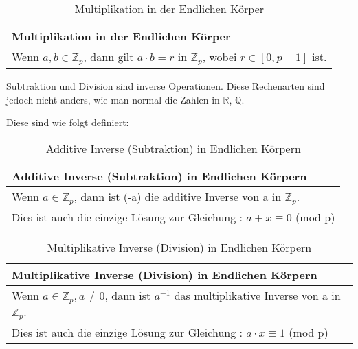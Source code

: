     \begin{table}[!ht]
        \centering
            \begin{tabular}{l}
                \toprule
                \textbf{Multiplikation in der Endlichen Körper}\\
                \midrule
                Wenn $ a, b \in \mathbb{Z}_p $, dann gilt $ a \cdot b =r$ in $ \mathbb{Z}_p $, wobei $r \in [0, p-1]$ ist.\\
               \bottomrule
            \end{tabular}
            \caption{Multiplikation in der Endlichen Körper\cite{sec1}}
            \label{tab3}
        \end{table}

Subtraktion und Division sind inverse Operationen. Diese Rechenarten sind jedoch nicht anders, wie man normal die Zahlen in $\mathbb{R}$, $\mathbb{Q}$.

Diese sind wie folgt definiert:
\begin{table}[!ht]
    \centering
        \begin{tabular}{l}
            \toprule
            \textbf{Additive Inverse (Subtraktion) in Endlichen Körpern}\\
            \midrule
            Wenn $a \in \mathbb{Z}_p$, dann ist (-a) die additive Inverse von a in $\mathbb{Z}_p$.\\
             Dies ist auch die einzige Lösung zur Gleichung : $a + x \equiv 0$ (mod p)\\
                        \bottomrule
        \end{tabular}
        \caption{Additive Inverse (Subtraktion) in Endlichen Körpern \cite{sec1}}
        \label{tab3}
    \end{table}

    \begin{table}[!ht]
        \centering
            \begin{tabular}{l}
                \toprule
                \textbf{Multiplikative Inverse (Division) in Endlichen Körpern}\\
                \midrule
                Wenn $a \in \mathbb{Z}_p, a \neq 0 $,  dann ist $a^{-1}$ das multiplikative Inverse von a in $\mathbb{Z}_p$.\\
                 Dies ist auch die einzige Lösung zur Gleichung : $a \cdot x \equiv 1$ (mod p)          \\
                 \bottomrule
            \end{tabular}
            \caption{Multiplikative Inverse (Division) in Endlichen Körpern \cite{sec1}}
            \label{tab3}
        \end{table}
\newpage
